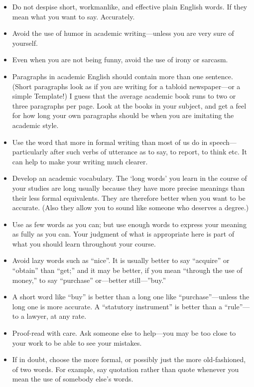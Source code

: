 \begin{itemize}
\item Do not despise short, workmanlike, and effective plain English words. If they mean what you want to say. Accurately.
\item Avoid the use of humor in academic writing---unless you are very sure of yourself.
\item Even when you are not being funny, avoid the use of irony or sarcasm.
\item Paragraphs in academic English should contain more than one sentence. (Short paragraphs look as if you are writing for a tabloid newspaper---or a simple Template!) I guess that the average academic book runs to two or three paragraphs per page. Look at the books in your subject, and get a feel for how long your own paragraphs should be when you are imitating the academic style.
\item Use the word that more in formal writing than most of us do in speech---particularly after such verbs of utterance as to say, to report, to think etc. It can help to make your writing much clearer.
\item Develop an academic vocabulary. The `long words' you learn in the course of your studies are long usually because they have more precise meanings than their less formal equivalents. They are therefore better when you want to be accurate. (Also they allow you to sound like someone who deserves a degree.)
\end{itemize}



\begin{itemize}
\item  Use as few words as you can; but use enough words to express your meaning as fully as you can. Your judgment of what is appropriate here is part of what you should learn throughout your course.
\item  Avoid lazy words such as ``nice''. It is usually better to say ``acquire'' or ``obtain'' than ``get;'' and it may be better, if you mean ``through the use of money,'' to say ``purchase'' or---better still---''buy.''
\item A short word like ``buy'' is better than a long one like ``purchase''---unless the long one is more accurate. A ``statutory instrument'' is better than a ``rule''---to a lawyer, at any rate.
\item Proof-read with care. Ask someone else to help---you may be too close to your work to be able to see your mistakes.
\item If in doubt, choose the more formal, or possibly just the more old-fashioned, of two words. For example, say quotation rather than quote whenever you mean the use of somebody else's words.
\end{itemize}




